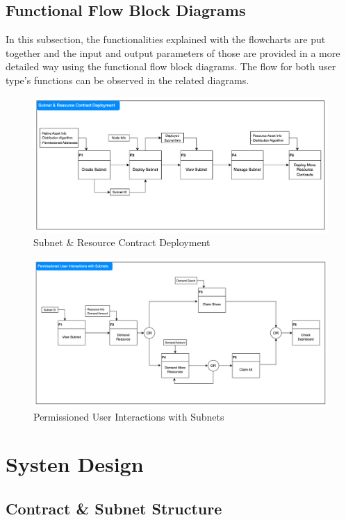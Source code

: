 \documentclass[a4paper,12pt]{report}
\begin{document}
\subsection{Functional Flow Block Diagrams}
In this subsection, the functionalities explained with the flowcharts are put together and the input and output parameters of those are provided in a more detailed way using the functional flow block diagrams. The flow for both user type’s functions can be observed in the related diagrams.

\begin{figure}[H]
	\centering
	\includegraphics[width=1\textwidth]{function_1.png}
	\caption{Subnet \& Resource Contract Deployment}
\end{figure}

\begin{figure}[H]
	\centering
	\includegraphics[width=1\textwidth]{function_2.png}
	\caption{Permissioned User Interactions with Subnets}
\end{figure}

\section{Systen Design}
\subsection{Contract \& Subnet Structure}
\end{document}
